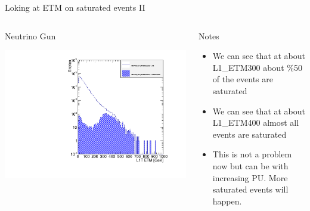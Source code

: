 \documentclass[8pt]{beamer}
\begin{document}
\begin{frame}{Loking at ETM on saturated events II}

\begin{columns}
 
\begin{block}{Neutrino Gun}
\centering

\includegraphics[width=\linewidth]{fig/L1ETM_Overlap.pdf}

\end{block}

\begin{block}{Notes}

\begin{itemize}
  \item We can see that at about L1\_ETM300 about \%50 of the events are saturated 
  \item We can see that at about L1\_ETM400 almost all events are saturated
  \item This is not a problem now but can be with increasing PU. More saturated events will happen.
\end{itemize}


\end{block}

\end{columns}
 
\end{frame}
\end{document}
